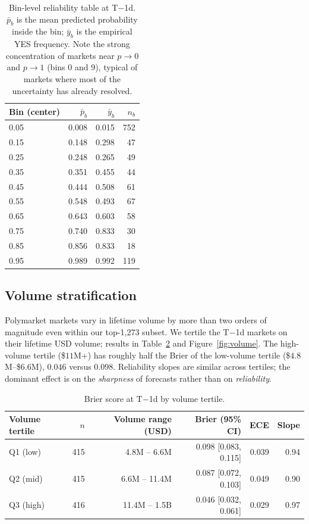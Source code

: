 \documentclass{article}
\begin{document}
\begin{table}[t]
\centering
\caption{Bin-level reliability table at T$-$1d.
$\bar p_b$ is the mean predicted probability inside the bin;
$\bar y_b$ is the empirical YES frequency. Note the strong
concentration of markets near $p \to 0$ and $p \to 1$ (bins 0 and 9),
typical of markets where most of the uncertainty has already
resolved.}
\label{tab:reliability}
\begin{tabular}{lrrr}
\toprule
Bin (center) & $\bar p_b$ & $\bar y_b$ & $n_b$ \\
\midrule
0.05 & 0.008 & 0.015 & 752 \\
0.15 & 0.148 & 0.298 & 47  \\
0.25 & 0.248 & 0.265 & 49  \\
0.35 & 0.351 & 0.455 & 44  \\
0.45 & 0.444 & 0.508 & 61  \\
0.55 & 0.548 & 0.493 & 67  \\
0.65 & 0.643 & 0.603 & 58  \\
0.75 & 0.740 & 0.833 & 30  \\
0.85 & 0.856 & 0.833 & 18  \\
0.95 & 0.989 & 0.992 & 119 \\
\bottomrule
\end{tabular}
\end{table}

\subsection{Volume stratification}

Polymarket markets vary in lifetime volume by more than two orders
of magnitude even within our top-1{,}273 subset. We tertile the
T$-$1d markets on their lifetime USD volume; results in
Table~\ref{tab:volume} and Figure~\ref{fig:volume}. The high-volume
tertile (\$$11$M+) has roughly half the Brier of the low-volume
tertile (\$$4.8$M--\$$6.6$M), $0.046$ versus $0.098$. Reliability
slopes are similar across tertiles; the dominant effect is on the
\emph{sharpness} of forecasts rather than on \emph{reliability}.

\begin{table}[h]
\centering
\caption{Brier score at T$-$1d by volume tertile.}
\label{tab:volume}
\begin{tabular}{lrrrrr}
\toprule
Volume tertile        & $n$ & Volume range (USD)  & Brier (95\% CI)     & ECE   & Slope \\
\midrule
Q1 (low)              & 415 & 4.8M -- 6.6M        & 0.098 [0.083, 0.115] & 0.039 & 0.94 \\
Q2 (mid)              & 415 & 6.6M -- 11.4M       & 0.087 [0.072, 0.103] & 0.049 & 0.90 \\
Q3 (high)             & 416 & 11.4M -- 1.5B       & 0.046 [0.032, 0.061] & 0.029 & 0.97 \\
\bottomrule
\end{tabular}
\end{table}
\end{document}
